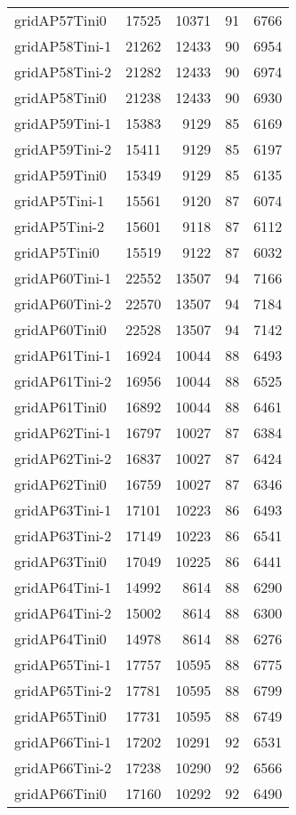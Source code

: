 \begin{longtable}{lrrrr}
gridAP57Tini0 & 17525 & 10371 & 91 & 6766 \\
gridAP58Tini-1 & 21262 & 12433 & 90 & 6954 \\
gridAP58Tini-2 & 21282 & 12433 & 90 & 6974 \\
gridAP58Tini0 & 21238 & 12433 & 90 & 6930 \\
gridAP59Tini-1 & 15383 & 9129 & 85 & 6169 \\
gridAP59Tini-2 & 15411 & 9129 & 85 & 6197 \\
gridAP59Tini0 & 15349 & 9129 & 85 & 6135 \\
gridAP5Tini-1 & 15561 & 9120 & 87 & 6074 \\
gridAP5Tini-2 & 15601 & 9118 & 87 & 6112 \\
gridAP5Tini0 & 15519 & 9122 & 87 & 6032 \\
gridAP60Tini-1 & 22552 & 13507 & 94 & 7166 \\
gridAP60Tini-2 & 22570 & 13507 & 94 & 7184 \\
gridAP60Tini0 & 22528 & 13507 & 94 & 7142 \\
gridAP61Tini-1 & 16924 & 10044 & 88 & 6493 \\
gridAP61Tini-2 & 16956 & 10044 & 88 & 6525 \\
gridAP61Tini0 & 16892 & 10044 & 88 & 6461 \\
gridAP62Tini-1 & 16797 & 10027 & 87 & 6384 \\
gridAP62Tini-2 & 16837 & 10027 & 87 & 6424 \\
gridAP62Tini0 & 16759 & 10027 & 87 & 6346 \\
gridAP63Tini-1 & 17101 & 10223 & 86 & 6493 \\
gridAP63Tini-2 & 17149 & 10223 & 86 & 6541 \\
gridAP63Tini0 & 17049 & 10225 & 86 & 6441 \\
gridAP64Tini-1 & 14992 & 8614 & 88 & 6290 \\
gridAP64Tini-2 & 15002 & 8614 & 88 & 6300 \\
gridAP64Tini0 & 14978 & 8614 & 88 & 6276 \\
gridAP65Tini-1 & 17757 & 10595 & 88 & 6775 \\
gridAP65Tini-2 & 17781 & 10595 & 88 & 6799 \\
gridAP65Tini0 & 17731 & 10595 & 88 & 6749 \\
gridAP66Tini-1 & 17202 & 10291 & 92 & 6531 \\
gridAP66Tini-2 & 17238 & 10290 & 92 & 6566 \\
gridAP66Tini0 & 17160 & 10292 & 92 & 6490 \\

\end{longtable}
